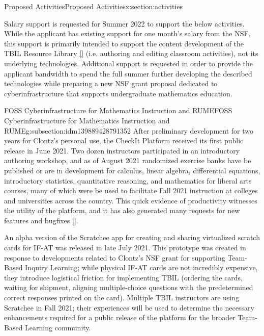\documentclass[oneside,10pt,]{article}
\newcommand{\xreffont}{\relax}
\begin{document}
\begin{sectionptx}{Proposed Activities}{}{Proposed Activities}{}{}{x:section:activities}
\begin{introduction}{}%
Salary support is requested for Summer 2022 to support the below activities. While the applicant has existing support for one month's salary from the NSF, this support is primarily intended to support the content development of the TBIL Resource Library \hyperlink{x:biblio:biblio-tbil-library}{[{\xreffont 18}]} (i.e. authoring and editing classroom activities), not its underlying technologies. Additional support is requested in order to provide the applicant bandwidth to spend the full summer further developing the described technologies while preparing a new NSF grant proposal dedicated to cyberinfrastructure that supports undergraduate mathematics education.%
\end{introduction}%
%
%
\typeout{************************************************}
\typeout{************************************************}
%
\begin{subsectionptx}{FOSS Cyberinfrastructure for Mathematics Instruction and RUME}{}{FOSS Cyberinfrastructure for Mathematics Instruction and RUME}{}{}{g:subsection:idm139889428791352}
After preliminary development for two years for Clontz's personal use, the CheckIt Platform received its first public release in June 2021. Two dozen instructors participated in an introductory authoring workshop, and as of August 2021 randomized exercise banks have be published or are in development for calculus, linear algebra, differential equations, introductory statistics, quantitative reasoning, and mathematics for liberal arts courses, many of which were be used to facilitate Fall 2021 instruction at colleges and universities across the country. This quick evidence of productivity witnesses the utility of the platform, and it has also generated many requests for new features and bugfixes \hyperlink{x:biblio:biblio-checkit-issues}{[{\xreffont 8}]}.%
\par
An alpha version of the Scratchee app for creating and sharing virtualized scratch cards for IF-AT was released in late July 2021. This prototype was created in response to developments related to Clontz's NSF grant for supporting Team-Based Inquiry Learning; while physical IF-AT cards are not incredibly expensive, they introduce logistical friction for implementing TBIL (ordering the cards, waiting for shipment, aligning multiple-choice questions with the predetermined correct responses printed on the card). Multiple TBIL instructors are using Scratchee in Fall 2021; their experiences will be used to determine the necessary enhancements required for a public release of the platform for the broader Team-Based Learning community.%

\end{subsectionptx}
\end{sectionptx}
\end{document}
